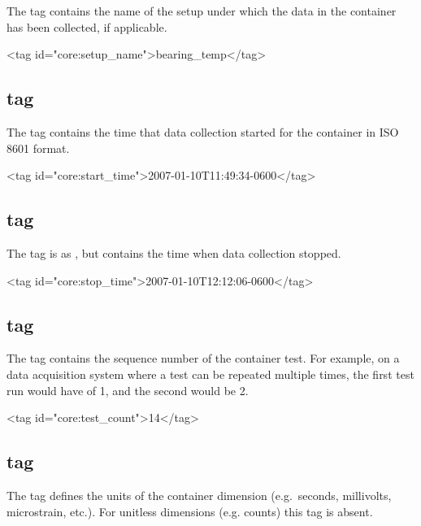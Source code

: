 \documentclass{article}
\begin{document}
The  tag contains the name of the setup under
which the data in the container has been collected, if applicable.

\begin{siexmlexample}
<tag id="core:setup_name">bearing_temp</tag>
\end{siexmlexample}

\subsection{ tag}

The  tag contains the time that data collection
started for the container in ISO 8601 format.

\begin{siexmlexample}
<tag id="core:start_time">2007-01-10T11:49:34-0600</tag>
\end{siexmlexample}

\subsection{ tag}

The  tag is as , but
contains the time when data collection stopped.

\begin{siexmlexample}
<tag id="core:stop_time">2007-01-10T12:12:06-0600</tag>
\end{siexmlexample}

\subsection{ tag}

The  tag contains the sequence number of the
container test.  For example, on a data acquisition system where a
test can be repeated multiple times, the first test run would have
 of 1, and the second would be 2.

\begin{siexmlexample}
<tag id="core:test_count">14</tag>
\end{siexmlexample}

\subsection{ tag}

The  tag defines the units of the container dimension
(e.g.\ seconds, millivolts, microstrain, etc.).  For unitless
dimensions (e.g. counts) this tag is absent.
\end{document}
